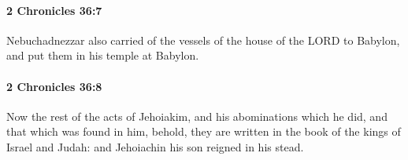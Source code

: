 		\paragraph{2 Chronicles 36:7} %
			\label{2CHRONICLES-36-7}

			Nebuchadnezzar also carried of the vessels of the house of the LORD to Babylon, and put them in his temple at Babylon.


		\paragraph{2 Chronicles 36:8} %
			\label{2CHRONICLES-36-8}

			Now the rest of the acts of Jehoiakim, and his abominations which he did, and that which was found in him, behold, they are written in the book of the kings of Israel and Judah: and Jehoiachin his son reigned in his stead.


